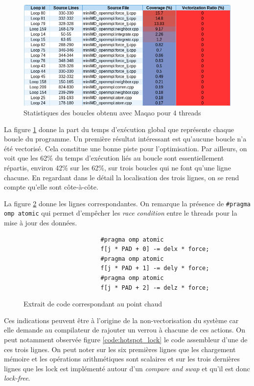 \documentclass[11pt,a4paper]{article}
\begin{document}
			\begin{figure}[h!]
				\begin{center}
					\includegraphics[width=500px]{images/maqao_loops.png}
					\caption{Statistiques des boucles obtenu avec Maqao pour 4 threads}
					\label{loop_maqao}
				\end{center}
			\end{figure}

			La figure \ref{loop_maqao} donne la part du temps d'exécution global que représente chaque boucle du programme. Un première résultat intéressant est qu'aucune boucle n'a été vectorisé. Cela constitue une bonne piste pour l'optimisation. Par ailleurs, on voit que les 62\% du temps d'exécution liés au boucle sont essentiellement répartis, environ 42\% sur les 62\%, sur trois boucles qui ne font qu'une ligne chacune. En regardant dans le détail la localisation des trois lignes, on se rend compte qu'elle sont côte-à-côte.

			La figure \ref{code:hotspot} donne les lignes correspondantes. On remarque la présence de \verb!#pragma omp atomic! qui permet d'empêcher les \textit{race condition} entre le threads pour la mise à jour des données.

			\begin{figure}[h!]
				\caption{Extrait de code correspondant au point chaud}
				\label{code:hotspot}
				\begin{verbatim}
					  #pragma omp atomic
					  f[j * PAD + 0] -= delx * force;
					  #pragma omp atomic
					  f[j * PAD + 1] -= dely * force;
					  #pragma omp atomic
					  f[j * PAD + 2] -= delz * force;
				\end{verbatim}
			\end{figure}

			Ces indications peuvent être à l'origine de la non-vectorisation du système car elle demande au compilateur de rajouter un verrou à chacune de ces actions. On peut notamment observée figure \ref{code:hotspot_lock} le code assembleur d'une de ces trois lignes. On peut noter sur les six premières lignes que les chargement mémoire et les opérations arithmétiques sont scalaires et sur les trois dernières lignes que les lock est implémenté autour d'un \textit{compare and swap} et qu'il est donc \textit{lock-free}.
\end{document}
